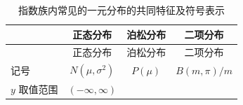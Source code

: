 \documentclass[12pt,a4paper,UTF8,twoside]{book}
\theoremstyle{definition}
\theoremstyle{definition}
\theoremstyle{definition}
\theoremstyle{remark}
\begin{document}
\begin{longtable}[]{@{}lccc@{}}
\caption[\label{tab:common-characteristics}
指数族内常见的一元分布的共同特征及符号表示]{\label{tab:common-characteristics}
指数族内常见的一元分布的共同特征及符号表示\footnotemark{}}\tabularnewline
\toprule
\begin{minipage}[b]{0.21\columnwidth}\raggedright
\strut
\end{minipage} & \begin{minipage}[b]{0.22\columnwidth}\centering
正态分布\strut
\end{minipage} & \begin{minipage}[b]{0.22\columnwidth}\centering
泊松分布\strut
\end{minipage} & \begin{minipage}[b]{0.22\columnwidth}\centering
二项分布\strut
\end{minipage}\tabularnewline
\midrule
\endfirsthead
\toprule
\begin{minipage}[b]{0.21\columnwidth}\raggedright
\strut
\end{minipage} & \begin{minipage}[b]{0.22\columnwidth}\centering
正态分布\strut
\end{minipage} & \begin{minipage}[b]{0.22\columnwidth}\centering
泊松分布\strut
\end{minipage} & \begin{minipage}[b]{0.22\columnwidth}\centering
二项分布\strut
\end{minipage}\tabularnewline
\midrule
\endhead
\begin{minipage}[t]{0.21\columnwidth}\raggedright
记号\strut
\end{minipage} & \begin{minipage}[t]{0.22\columnwidth}\centering
\(N(\mu,\sigma^2)\)\strut
\end{minipage} & \begin{minipage}[t]{0.22\columnwidth}\centering
\(P(\mu)\)\strut
\end{minipage} & \begin{minipage}[t]{0.22\columnwidth}\centering
\(B(m,\pi)/m\)\strut
\end{minipage}\tabularnewline
\begin{minipage}[t]{0.21\columnwidth}\raggedright
\(y\) 取值范围\strut
\end{minipage} & \begin{minipage}[t]{0.22\columnwidth}\centering
\((-\infty,\infty)\)\strut
\end{minipage} & \begin{minipage}[t]{0.22\columnwidth}\centering

\end{minipage}
\end{longtable}
\end{document}
